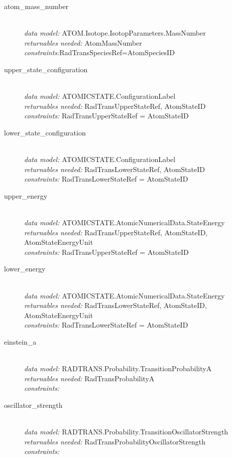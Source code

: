 \documentclass[11pt,a4paper]{ivoa}
\begin{document}
\begin{description}
	\item [atom\_mass\_number]\hfill\\
	\textit{data model:} ATOM.Isotope.IsotopParameters.MassNumber\\
	\textit{returnables needed:} AtomMassNumber\\
	\textit{constraints:}RadTransSpeciesRef=AtomSpeciesID

	\item [upper\_state\_configuration]\hfill\\
	\textit{data model:} ATOMICSTATE.ConfigurationLabel\\
	\textit{returnables needed:} RadTransUpperStateRef, AtomStateID\\
	\textit{constraints:}  RadTransUpperStateRef = AtomStateID

\item [lower\_state\_configuration]\hfill\\
	\textit{data model:} ATOMICSTATE.ConfigurationLabel\\
	\textit{returnables needed:} RadTransLowerStateRef, AtomStateID\\
	\textit{constraints:}  RadTransLowerStateRef = AtomStateID

\item [upper\_energy]\hfill\\
	\textit{data model:} ATOMICSTATE.AtomicNumericalData.StateEnergy\\
	\textit{returnables needed:} RadTransUpperStateRef, AtomStateID, AtomStateEnergyUnit\\
	\textit{constraints:}  RadTransUpperStateRef = AtomStateID

\item [lower\_energy]\hfill\\
	\textit{data model:} ATOMICSTATE.AtomicNumericalData.StateEnergy\\
	\textit{returnables needed:} RadTransLowerStateRef, AtomStateID, AtomStateEnergyUnit\\
	\textit{constraints:}  RadTransLowerStateRef = AtomStateID

\item [einstein\_a]\hfill\\
	\textit{data model:}  RADTRANS.Probability.TransitionProbabilityA\\
	\textit{returnables needed:} RadTransProbabilityA\\
	\textit{constraints:}

\item [oscillator\_strength]\hfill\\
	\textit{data model:}  RADTRANS.Probability.TransitionOscillatorStrength\\
	\textit{returnables needed:} RadTransProbabilityOscillatorStrength\\
    \textit{constraints:}


\end{description}
\end{document}
